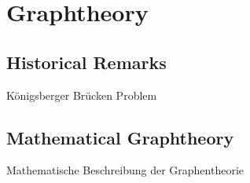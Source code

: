 \chapter{Graphtheory}\label{sec:geo}


\section{Historical Remarks}\label{sec:geoobj}
K\"onigsberger Br\"ucken Problem

\section{Mathematical Graphtheory}\label{sec:works}
Mathematische Beschreibung der Graphentheorie
